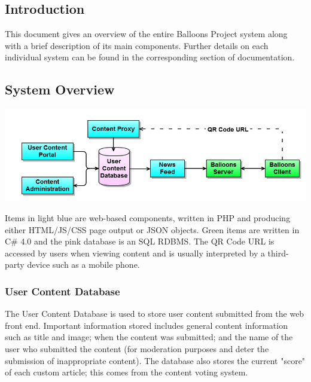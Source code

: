 
%

\subsection{Introduction}
This document gives an overview of the entire Balloons Project system along 
with a brief description of its main components. Further details on each 
individual system can be found in the corresponding section of documentation.

\subsection{System Overview}

\includegraphics[width=\textwidth]{Diagrams/System-Architecture-Diagram.png}

Items in light blue are web-based components, written in PHP and producing 
either HTML/JS/CSS page output or JSON objects. Green items are written in C\#
4.0 and the pink database is an SQL RDBMS. The QR Code URL is accessed by users
when viewing content and is usually interpreted by a third-party device such as
a mobile phone.

\subsubsection{User Content Database}
The User Content Database is used to store user content submitted from the web
front end. Important information stored includes general content information 
such as title and image; when the content was submitted; and the name of the 
user who submitted the content (for moderation purposes and deter the 
submission of inappropriate content). The database also stores the current 
"score" of each custom article; this comes from the content voting system. 

